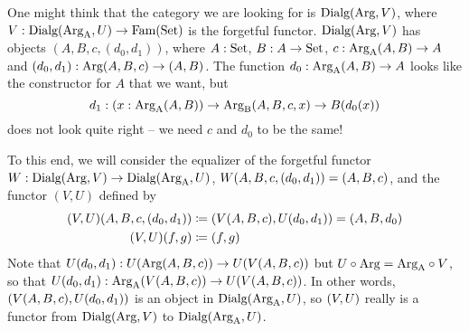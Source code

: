 \documentclass[orivec,envcountsame, ,envcountsect]{llncs}
\begin{document}
One might think that the category we are looking for is
$\text{Dialg}(\text{Arg}, V)$, where $V :
\text{Dialg}(\text{Arg}_{\text{A}}, U) \to \text{Fam}(\text{Set})$ is the forgetful functor. $\text{Dialg}(\text{Arg}, V)$ has
objects $(A, B, c, (d_0, d_1))$, where $A : \text{Set}$, $B : A \to \text{Set}$,
$c : \text{Arg}_{\text{A}}(A, B) \to A$ and $(d_0, d_1) : \text{Arg}(A, B, c) \to (A, B)$.
The function $d_0 : \text{Arg}_{\text{A}}(A, B) \to A$ looks like the constructor for
$A$ that we want, but
\[
d_1 : (x : \text{Arg}_{\text{A}}(A, B)) \to \text{Arg}_{\text{B}}(A, B, c,x) \to B(d_0(x))
\]
does not look quite right -- we need $c$ and $d_0$ to be the same!

To this end, we will consider the equalizer of the forgetful functor
$W : \text{Dialg}(\text{Arg}, V) \to
\text{Dialg}(\text{Arg}_{\text{A}}, U)$, $W(A, B, c, (d_0, d_1)) = (A, B, c)$, and the functor $(V, U)$ defined by 
\begin{align*}
  (V, U)(A, B, c, (d_0, d_1))
     &\coloneqq (V(A, B, c), U(d_0, d_1)) = (A, B, d_0) \\
  (V, U)(f, g)
     &\coloneqq (f, g)
\end{align*}
Note that $U(d_0, d_1) : U(\text{Arg}(A, B, c)) \to
U(V(A, B, c))$ but $U \circ \text{Arg} = \text{Arg}_{\text{A}}
\circ V$, so that $U(d_0, d_1) :
\text{Arg}_{\text{A}}(V(A, B, c)) \to U(V(A, B, c))$. In
other words, $(V(A, B, c), U(d_0, d_1))$ is an
object in $\text{Dialg}(\text{Arg}_{\text{A}}, U)$, so $(V, U)$
really is a functor from $\text{Dialg}(\text{Arg}, V)$ to
$\text{Dialg}(\text{Arg}_{\text{A}}, U)$.

\end{document}

